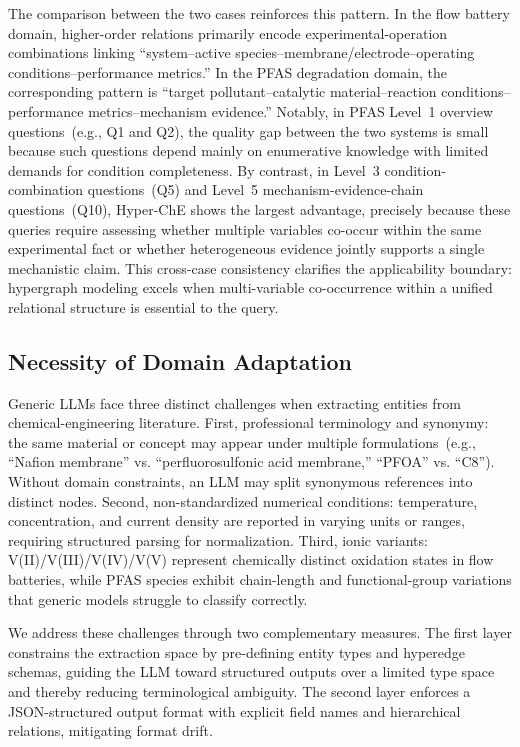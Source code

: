 The comparison between the two cases reinforces this pattern. In the flow battery domain, higher-order relations primarily encode experimental-operation combinations linking ``system--active species--membrane/electrode--operating conditions--performance metrics.'' In the PFAS degradation domain, the corresponding pattern is ``target pollutant--catalytic material--reaction conditions--performance metrics--mechanism evidence.'' Notably, in PFAS Level~1 overview questions~(e.g., Q1 and Q2), the quality gap between the two systems is small because such questions depend mainly on enumerative knowledge with limited demands for condition completeness. By contrast, in Level~3 condition-combination questions~(Q5) and Level~5 mechanism-evidence-chain questions~(Q10), Hyper-ChE shows the largest advantage, precisely because these queries require assessing whether multiple variables co-occur within the same experimental fact or whether heterogeneous evidence jointly supports a single mechanistic claim. This cross-case consistency clarifies the applicability boundary: hypergraph modeling excels when multi-variable co-occurrence within a unified relational structure is essential to the query.

\subsection{Necessity of Domain Adaptation}

Generic LLMs face three distinct challenges when extracting entities from chemical-engineering literature. First, professional terminology and synonymy: the same material or concept may appear under multiple formulations~(e.g., ``Nafion membrane'' vs. ``perfluorosulfonic acid membrane,'' ``PFOA'' vs. ``C8''). Without domain constraints, an LLM may split synonymous references into distinct nodes. Second, non-standardized numerical conditions: temperature, concentration, and current density are reported in varying units or ranges, requiring structured parsing for normalization. Third, ionic variants: V(II)/V(III)/V(IV)/V(V) represent chemically distinct oxidation states in flow batteries, while PFAS species exhibit chain-length and functional-group variations that generic models struggle to classify correctly.

We address these challenges through two complementary measures. The first layer constrains the extraction space by pre-defining entity types and hyperedge schemas, guiding the LLM toward structured outputs over a limited type space and thereby reducing terminological ambiguity. The second layer enforces a JSON-structured output format with explicit field names and hierarchical relations, mitigating format drift.

